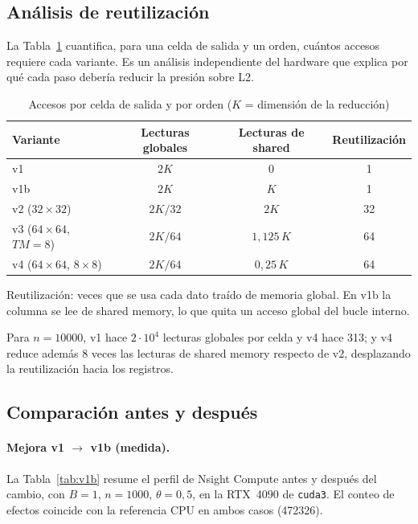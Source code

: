 \documentclass[11pt,a4paper]{article}
\begin{document}
\subsection{Análisis de reutilización}
La Tabla~\ref{tab:reuso} cuantifica, para una celda de salida y un orden, cuántos accesos
requiere cada variante. Es un análisis independiente del hardware que explica por qué cada
paso debería reducir la presión sobre L2.

\begin{table}[h]
\centering
\caption{Accesos por celda de salida y por orden ($K$ = dimensión de la reducción)}
\label{tab:reuso}
\begin{tabular}{lccc}
\toprule
\textbf{Variante} & \textbf{Lecturas globales} & \textbf{Lecturas de shared} &
\textbf{Reutilización}\\
\midrule
v1   & $2K$        & 0           & 1\\
v1b  & $2K$        & $K$         & 1\\
v2 ($32\times32$)            & $2K/32$ & $2K$     & 32\\
v3 ($64\times64$, $TM=8$)    & $2K/64$ & $1{,}125\,K$ & 64\\
v4 ($64\times64$, $8\times8$) & $2K/64$ & $0{,}25\,K$  & 64\\
\bottomrule
\end{tabular}

\smallskip
{\footnotesize Reutilización: veces que se usa cada dato traído de memoria global. En v1b la
columna se lee de shared memory, lo que quita un acceso global del bucle interno.}
\end{table}

Para $n=\num{10000}$, v1 hace $2\cdot 10^4$ lecturas globales por celda y v4 hace 313; y v4
reduce además 8 veces las lecturas de shared memory respecto de v2, desplazando la
reutilización hacia los registros.

\subsection{Comparación antes y después}

\paragraph{Mejora v1 $\rightarrow$ v1b (medida).}
La Tabla~\ref{tab:v1b} resume el perfil de Nsight Compute antes y después del cambio, con
$B=1$, $n=\num{1000}$, $\theta=0{,}5$, en la RTX~4090 de \texttt{cuda3}. El conteo de
efectos coincide con la referencia CPU en ambos casos (\num{472326}).
\end{document}
